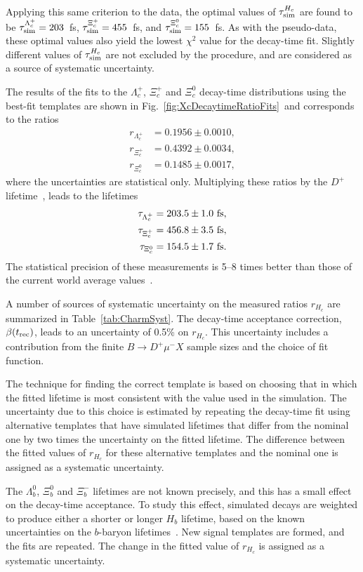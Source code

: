 \documentclass[12pt,a4paper]{article}
\def\Pmu         {\ensuremath{\upmu}\xspace}
\def\PXi         {\ensuremath{\Xi}\xspace}
\def\PLambda     {\ensuremath{\Lambda}\xspace}
\def\PD      {\ensuremath{\mathrm{D}}\xspace}
\def\Pb      {\ensuremath{\mathrm{b}}\xspace}
\def\Pc      {\ensuremath{\mathrm{c}}\xspace}
\def\Pmu         {\ensuremath{\mu}\xspace}
\def\PD      {\ensuremath{D}\xspace}
\def\Pb      {\ensuremath{b}\xspace}
\def\Pc      {\ensuremath{c}\xspace}
\def\mun        {{\ensuremath{\Pmu^-}}\xspace} \def\mupm       {{\ensuremath{\Pmu^\pm}}\xspace}
\def\cquark    {{\ensuremath{\Pc}}\xspace}
\def\bquark    {{\ensuremath{\Pb}}\xspace}
\def\D       {{\ensuremath{\PD}}\xspace}
\def\Dp      {{\ensuremath{\D^+}}\xspace}
\def\Lz          {{\ensuremath{\PLambda}}\xspace}
\def\Xires       {{\ensuremath{\PXi}}\xspace}
\def\Lc          {{\ensuremath{\Lz^+_\cquark}}\xspace}
\def\Xicz        {{\ensuremath{\Xires^0_\cquark}}\xspace}
\def\Xicp        {{\ensuremath{\Xires^+_\cquark}}\xspace}
\def\Lb           {{\ensuremath{\Lz^0_\bquark}}\xspace}
\def\Xibz         {{\ensuremath{\Xires^0_\bquark}}\xspace}
\def\Xibm         {{\ensuremath{\Xires^-_\bquark}}\xspace}
\def\to                 {\ensuremath{\rightarrow}\xspace}
\begin{document}
Applying this same criterion to the data, the optimal values of $\tau_{\rm sim}^{H_c}$ are found to be $\tau_{\rm sim}^{\Lc}=203$~fs, $\tau_{\rm sim}^{\Xicp}=455$~fs, 
and $\tau_{\rm sim}^{\Xicz}=155$~fs. As with the pseudo-data, these optimal values also yield the lowest $\chi^2$ value for the
decay-time fit. Slightly different values of $\tau_{\rm sim}^{H_c}$ are not excluded by the procedure, and are considered as a source of
systematic uncertainty.

The results of the fits to the $\Lc$, $\Xicp$ and $\Xicz$ decay-time distributions using the best-fit templates are 
shown in Fig.~\ref{fig:XcDecaytimeRatioFits}\, and corresponds to the ratios
\begin{align*}
  r_{\Lc} &= 0.1956\pm0.0010, \\
  r_{\Xicp} &= 0.4392\pm0.0034, \\
  r_{\Xicz} &= 0.1485\pm0.0017,
\end{align*}
\noindent where the uncertainties are statistical only.
Multiplying these ratios by the $\Dp$ lifetime~\cite{PDG2018}, leads to the lifetimes
\begin{align*}
  \tau_{\Lc} &= 203.5\pm1.0~{\rm fs}, \\
  \tau_{\Xicp} &= 456.8\pm3.5~{\rm fs}, \\
  \tau_{\Xicz} &= 154.5\pm1.7~{\rm fs}.
\end{align*}
\noindent The statistical precision of these measurements is 
5--8 times better than those of the current world average values~\cite{PDG2018}. 

A number of sources of systematic uncertainty on the measured ratios $r_{H_c}$ are summarized in Table~\ref{tab:CharmSyst}.
The decay-time acceptance correction, $\beta(t_{\rm rec})$, leads to an uncertainty of 0.5\% on $r_{H_c}$. This uncertainty includes a contribution from 
the finite $B\to\Dp\mun X$ sample sizes and the choice of fit function. 

The technique for finding the correct template is based on choosing that in which the fitted lifetime is most consistent with the
value used in the simulation. The uncertainty due to this choice is estimated by repeating the decay-time fit using
alternative templates that have simulated lifetimes that differ from the nominal one by 
two times the uncertainty on the fitted lifetime. The difference between the fitted values of $r_{H_c}$ for these 
alternative templates and the nominal one is assigned as a systematic uncertainty.

The $\Lb$, $\Xibz$ and $\Xibm$ lifetimes are not known precisely, and this has a small effect on the decay-time
acceptance. To study this effect, simulated decays are weighted to produce either a shorter or longer $H_b$ lifetime,
based on the known uncertainties on the $b$-baryon lifetimes~\cite{PDG2018}. New signal templates are formed, 
and the fits are repeated. The change in the fitted value of $r_{H_c}$ is assigned as a systematic uncertainty.
\end{document}
